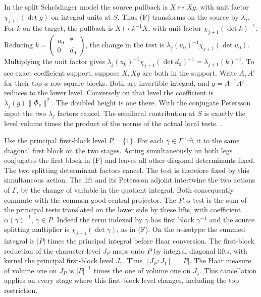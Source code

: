 In the split Schr\"odinger model the source pullback is
\(X\mapsto Xg\), with unit factor
\(\chi_{j+1}(\det g)\) on integral units at \(S\).
Thus (F) transforms on the source by \(\lambda_j\).
For \(k\) on the target, the pullback is
\(X\mapsto k^{-1}X\), with unit factor
\(\chi_{j+1}(\det k)^{-1}\). Reducing
\(k=\left(\begin{smallmatrix}u_0&*\\0&d_0\end{smallmatrix}\right)\),
the change in the test is
\(\lambda_j(u_0)^{-1}\chi_{j+1}(\det u_0)\).
Multiplying the unit factor gives
\(\lambda_j(u_0)^{-1}\chi_{j+1}(\det d_0)^{-1}
=\lambda_{j+1}(k)^{-1}\).
To see exact coefficient support, suppose \(X,Xg\) are
both in the support. Write \(A,A'\) for their top
\(a\)-row square blocks. Both are invertible integral,
and \(g=A^{-1}A'\) reduces to the lower level.
Conversely on that level the coefficient is
\(\lambda_j(g)\|\Phi_v\|^2\).
The doubled height is one there. With the conjugate
Petersson input the two \(\lambda_j\) factors cancel.
The semilocal contribution at \(S\) is exactly the
level volume times the product of the norms of the
actual local tests.
.

Use the principal first-block level \(P=\{1\}\).
For each \(\gamma\in\Gamma\) lift it to the same
diagonal first block on the two stages. Acting
simultaneously on both legs conjugates the first block
in (F) and leaves all other diagonal determinants fixed.
The two splitting determinant factors cancel. The test
is therefore fixed by this simultaneous action. The
lift and its Petersson adjoint intertwine the two
actions of \(\Gamma\), by the change of variable in the
quotient integral. Both consequently commute with the
common good central projector. The \(P,\alpha\) test
is the sum of the principal tests translated on the
lower side by these lifts, with coefficient
\(\alpha(\gamma)^{-1}\), \(\gamma\in P\).
Indeed the term indexed by \(\gamma\) has first block
\(\gamma^{-1}\) and the source splitting multiplier
is \(\chi_{j+1}(\det\gamma)\), as in (F).
On the \(\alpha\)-isotype the summed integral is
\(|P|\) times the principal integral before Haar
conversion. The first-block reduction of the character level
\(J_P\) maps onto \(P\) by integral diagonal lifts, with kernel
the principal first-block level \(J_1\). Thus \([J_P:J_1]=|P|\).
The Haar measure of volume one on \(J_P\) is \(|P|^{-1}\) times
the one of volume one on \(J_1\). This cancellation
applies on every stage where this first-block level
changes, including the top restriction.

